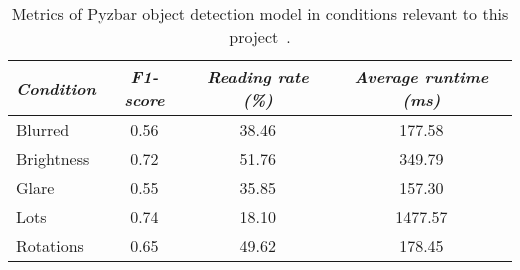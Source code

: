 \documentclass[../main.tex]{subfiles}
\begin{document}
\begin{table}[H]
    \centering
    \caption{Metrics of Pyzbar object detection model in conditions
    relevant to this project~\cite{boofcv}.}
    \begin{tabularx}{0.73\textwidth}{ X c c c }
        \toprule
        \textit{Condition} 
            & \textit{F1-score} 
                & \textit{Reading rate (\%)} 
                    & \textit{Average runtime (ms)} \\

        \midrule
        
        Blurred 
            & 0.56
            & 38.46
                & 177.58
                \\
        
        Brightness
            & 0.72
            & 51.76
                & 349.79
                \\
        
        Glare
            & 0.55
            & 35.85
                & 157.30
                \\
        
        Lots
            & 0.74
            & 18.10
                & 1477.57
                \\
        
        Rotations
            & 0.65
            & 49.62
                & 178.45
                \\
        
        \bottomrule		
    \end{tabularx}
\end{table}
\end{document}
